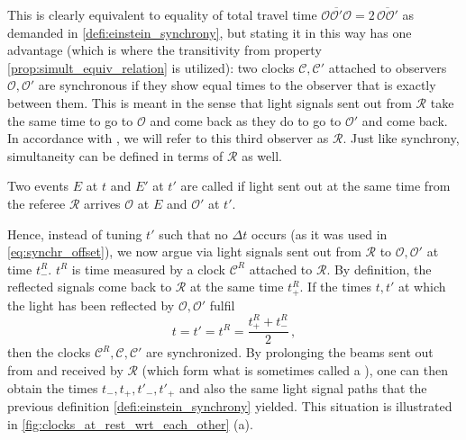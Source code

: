 This is clearly equivalent to equality of total travel time $\overline{\mathcal{O} \mathcal{O}' \mathcal{O}} = 2 \, \overline{\mathcal{O} \mathcal{O}'}$ as demanded in \ref{defi:einstein_synchrony}, but stating it in this way has one advantage (which is where the transitivity from property \ref{prop:simult_equiv_relation} is utilized): two clocks $\mathcal{C}, \mathcal{C}'$ attached to observers $\mathcal{O}, \mathcal{O}'$ are synchronous if they show equal times to the observer that is exactly between them. This is meant in the sense that light signals sent out from $\mathcal{R}$ take the same time to go to $\mathcal{O}$ and come back as they do to go to $\mathcal{O}'$ and come back. In accordance with \cite{dragon_geometry_srt}, we will refer to this third observer as  $\mathcal{R}$. Just like synchrony, simultaneity can be defined in terms of $\mathcal{R}$ as well.
\begin{defi}[Simultaneity 2]
	Two events $E$ at $t$ and $E'$ at $t'$ are called  if light sent out at the same time from the referee $\mathcal{R}$ arrives $\mathcal{O}$ at $E$ and $\mathcal{O}'$ at $t'$.
\end{defi}
Hence, instead of tuning $t'$ such that no $\Delta t$ occurs (as it was used in \eqref{eq:synchr_offset}), we now argue via light signals sent out from $\mathcal{R}$ to $\mathcal{O}, \mathcal{O}'$ at time $t^R_-$. $t^R$ is time measured by a clock $\mathcal{C}^R$ attached to $\mathcal{R}$. By definition, the reflected signals come back to $\mathcal{R}$ at the same time $t^R_+$. If the times $t, t'$ at which the light has been reflected by $\mathcal{O}, \mathcal{O}'$ fulfil
\begin{equation}\label{eq:synchr_referee}
	t = t' = t^R = \frac{t^R_+ + t^R_-}{2} \, ,
\end{equation}
then the clocks $\mathcal{C}^R, \mathcal{C}, \mathcal{C}'$ are synchronized. By prolonging the beams sent out from and received by $\mathcal{R}$ (which form what is sometimes called a ), one can then obtain the times $t_-, t_+, t'_-, t'_+$ and also the same light signal paths that the previous definition \ref{defi:einstein_synchrony} yielded. This situation is illustrated in \ref{fig:clocks_at_rest_wrt_each_other} (a).



